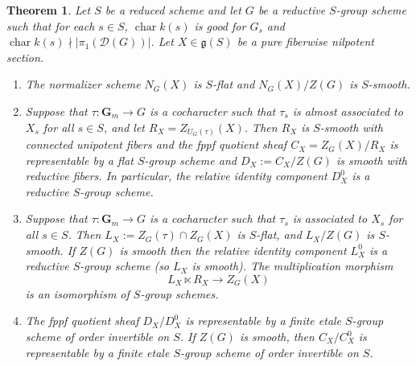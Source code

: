 \documentclass[11pt,reqno]{amsart}
\newtheorem{theorem}{Theorem}[section]
\theoremstyle{definition}
\newcommand{\bG}{{\mathbf G}}
\newcommand{\sD}{{\mathscr D}}
\newcommand{\fg}{\mathfrak{g}}
\DeclareMathOperator{\chara}{char}
\begin{document}
\begin{theorem}\label{theorem:flat-pure-centralizer-semidirect-product}
Let $S$ be a reduced scheme and let $G$ be a reductive $S$-group scheme such that for each $s \in S$, $\chara k(s)$ is good for $G_s$ and $\chara k(s) \nmid |\pi_1(\sD(G))|$. Let $X \in \fg(S)$ be a pure fiberwise nilpotent section.
\begin{enumerate}
    \item\label{item:relative-normalizer-scheme} The normalizer scheme $N_G(X)$ is $S$-flat and $N_G(X)/Z(G)$ is $S$-smooth.
    \item\label{item:nilpotent-centralizer-unipotent-part} Suppose that $\tau: \bG_m \to G$ is a cocharacter such that $\tau_s$ is almost associated to $X_s$ for all $s \in S$, and let $R_X = Z_{U_G(\tau)}(X)$. Then $R_X$ is $S$-smooth with connected unipotent fibers and the fppf quotient sheaf $C_X = Z_G(X)/R_X$ is representable by a flat $S$-group scheme and $D_X := C_X/Z(G)$ is smooth with reductive fibers. In particular, the relative identity component $D_X^0$ \cite[IV\textsubscript{3}, Cor.\ 15.6.5]{EGA} is a reductive $S$-group scheme.
    \item\label{item:nilpotent-centralizer-semidirect-product} Suppose that $\tau: \bG_m \to G$ is a cocharacter such that $\tau_s$ is associated to $X_s$ for all $s \in S$. Then $L_X := Z_G(\tau) \cap Z_G(X)$ is $S$-flat, and $L_X/Z(G)$ is $S$-smooth. If $Z(G)$ is smooth then the relative identity component $L_X^0$ is a reductive $S$-group scheme (so $L_X$ is smooth). The multiplication morphism
    \[
    L_X \ltimes R_X \to Z_G(X)
    \]
    is an isomorphism of $S$-group schemes.
    \item\label{item:finite-etale-component-group} The fppf quotient sheaf $D_X/D_X^0$ is representable by a finite etale $S$-group scheme of order invertible on $S$. If $Z(G)$ is smooth, then $C_X/C_X^0$ is representable by a finite etale $S$-group scheme of order invertible on $S$.
\end{enumerate}
\end{theorem}
\end{document}
